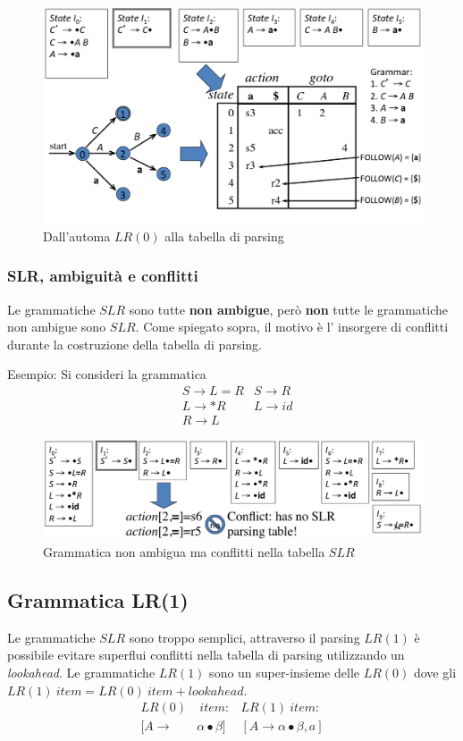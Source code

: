 \begin{figure}[H]
\centering
\includegraphics[scale=0.35]{res/image/LR_table}
\caption{Dall'automa $LR(0)$ alla tabella di parsing}
\label{img:LR_table}
\end{figure}

\subsubsection{SLR, ambiguit\`a e conflitti}
Le grammatiche $SLR$ sono tutte \textbf{non ambigue}, per\`o \textbf{non} tutte
le grammatiche non ambigue sono $SLR$. Come spiegato sopra, il motivo \`e l'
insorgere di conflitti durante la costruzione della tabella di parsing.

Esempio: Si consideri la grammatica
\begin{align*}
& S \to L=R & S \to R   \\
& L \to *R  & L \to id  \\
& R \to L
\end{align*}
\begin{figure}[H]
\centering
\includegraphics[scale=0.35]{res/image/SLR_table_conflict}
\caption{Grammatica non ambigua ma conflitti nella tabella $SLR$}
\label{img:SLR_table_conflict}
\end{figure}

\subsection{Grammatica LR(1)}
Le grammatiche $SLR$ sono troppo semplici, attraverso il parsing $LR(1)$ \`e
possibile evitare superflui conflitti nella tabella di parsing utilizzando un
\textit{lookahead}. Le grammatiche $LR(1)$ sono un super-insieme delle $LR(0)$
dove gli $LR(1) \ item = LR(0) \ item + lookahead$.
\begin{align*}
LR(0) &\ item: & LR(1) \ item: \\
[A \to& \alpha\bullet\beta]  & [A \to \alpha\bullet\beta, a]
\end{align*}

